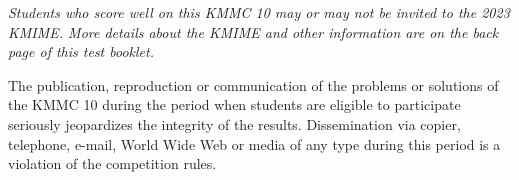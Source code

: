 \documentclass[10pt, twoside]{article}
\newcommand{\contestNumber}{10}
\newcommand{\contestName}{KMMC}
\newcommand{\aimeName}{KMIME}
\newcommand{\aimeYear}{2023}
\begin{document}
\begin{justify}
{\vspace{-5mm}

\begin{justify}
\textit{Students who score well on this {\contestName} {\contestNumber} may or may not be invited to the {\aimeYear} {\aimeName}. More details about the {\aimeName} and other information are on the back page of this test booklet.}
\end{justify}

\vspace{-5mm}

\begin{justify}
The publication, reproduction or communication of the problems or solutions of the {\contestName} {\contestNumber} during the period when students are eligible to participate seriously jeopardizes the integrity of the results. Dissemination via copier, telephone, e-mail, World Wide Web or media of any type during this period is a violation of the competition rules.
\end{justify}}

\end{justify}

\newpage
\end{document}
